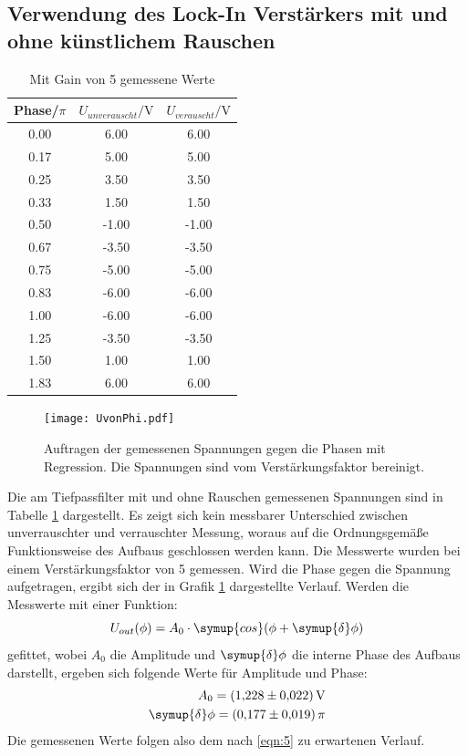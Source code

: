 \subsection{Verwendung des Lock-In Verstärkers mit und ohne künstlichem Rauschen}
\begin{table}
  \centering
  \caption{Mit Gain von 5 gemessene Werte}
  \label{tab:1}
  \begin{tabular}{c c c}
    \toprule
    Phase/$\si{\pi}$ & $U_{unverauscht}/\si{\volt}$ & $U_{verauscht}/\si{\volt}$ \\
    \midrule
    0.00 & 6.00 & 6.00 \\
    0.17 & 5.00 & 5.00 \\
    0.25 & 3.50 & 3.50 \\
    0.33 & 1.50 & 1.50 \\
    0.50 & -1.00 & -1.00 \\
    0.67 & -3.50 & -3.50 \\
    0.75 & -5.00 & -5.00 \\
    0.83 & -6.00 & -6.00 \\
    1.00 & -6.00 & -6.00 \\
    1.25 & -3.50 & -3.50 \\
    1.50 & 1.00 & 1.00 \\
    1.83 & 6.00 & 6.00 \\
    \bottomrule
  \end{tabular}
\end{table}
\begin{figure}
  \centering
     \texttt{[image: UvonPhi.pdf]}
  \caption{Auftragen der gemessenen Spannungen gegen die Phasen mit Regression. Die Spannungen sind vom Verstärkungsfaktor bereinigt.}
  \label{plot:1}
\end{figure}
Die am Tiefpassfilter mit und ohne Rauschen gemessenen Spannungen sind in Tabelle \ref{tab:1}
dargestellt. Es zeigt sich kein messbarer Unterschied zwischen unverrauschter und verrauschter Messung,
woraus auf die Ordnungsgemäße Funktionsweise des Aufbaus geschlossen werden kann.
Die Messwerte wurden bei einem Verstärkungsfaktor von 5 gemessen. Wird die Phase gegen die Spannung
aufgetragen, ergibt sich der in Grafik \ref{plot:1} dargestellte Verlauf. Werden die Messwerte mit einer
Funktion:
\begin{equation*}
  U_{out}(\phi) = A_0 \cdot \symup{cos}(\phi + \symup{\delta}\phi)
\end{equation*}
gefittet, wobei $A_0$ die Amplitude und $\symup{\delta}\phi$ die interne Phase des Aufbaus darstellt,
ergeben sich folgende Werte für Amplitude und Phase:
\begin{equation*}
  \begin{split}
    A_0 = \SI{1.228(22)}{\volt} \\
    \symup{\delta}\phi = \SI{0.177(19)}{\pi}
  \end{split}
\end{equation*}
Die gemessenen Werte folgen also dem nach \eqref{eqn:5} zu erwartenen Verlauf.
